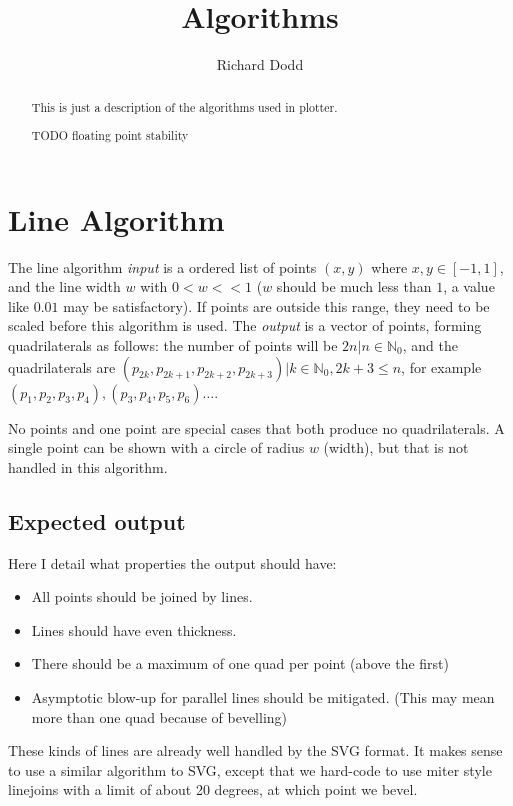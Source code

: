 \documentclass[]{article}
\title{Algorithms}
\author{Richard Dodd}
\begin{document}
\maketitle

\begin{abstract}
This is just a description of the algorithms used in plotter.

TODO floating point stability
\end{abstract}

\section{Line Algorithm}
The line algorithm \emph{input} is a ordered list of points $(x, y)$ where $x, y \in [-1, 1]$, and the line width $w$ with $0 < w << 1$ ($w$ should be much less than $1$, a value like $0.01$ may be satisfactory). If points are outside this range, they need to be scaled before this algorithm is used. The \emph{output} is a vector of points, forming quadrilaterals as follows: the number of points will be $2n| n \in \mathbb{N}_0$, and the quadrilaterals are $(p_{2k}, p_{2k+1}, p_{2k+2}, p_{2k+3}) | k \in \mathbb{N}_0, 2k+3 \le n$, for example $(p_1, p_2, p_3, p_4), (p_3, p_4, p_5, p_6) \dots$.

No points and one point are special cases that both produce no quadrilaterals. A single point can be shown with a circle of radius $w$ (width), but that is not handled in this algorithm.

\subsection{Expected output}
Here I detail what properties the output should have:
\begin{itemize}
	\item All points should be joined by lines.
	\item Lines should have even thickness.
	\item There should be a maximum of one quad per point (above the first)
	\item Asymptotic blow-up for parallel lines should be mitigated. (This may mean more than one quad because of bevelling)
\end{itemize}

These kinds of lines are already well handled by the SVG format. It makes sense to use a similar algorithm to SVG, except that we hard-code to use miter style linejoins \cite{stroke-linejoin} with a limit \cite{stroke-miterlimit} of about 20 degrees, at which point we bevel.
\end{document}

